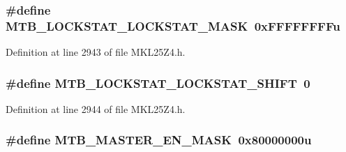 \subsubsection[{\texorpdfstring{M\+T\+B\+\_\+\+L\+O\+C\+K\+S\+T\+A\+T\+\_\+\+L\+O\+C\+K\+S\+T\+A\+T\+\_\+\+M\+A\+SK}{MTB_LOCKSTAT_LOCKSTAT_MASK}}]{\setlength{\rightskip}{0pt plus 5cm}\#define M\+T\+B\+\_\+\+L\+O\+C\+K\+S\+T\+A\+T\+\_\+\+L\+O\+C\+K\+S\+T\+A\+T\+\_\+\+M\+A\+SK~0x\+F\+F\+F\+F\+F\+F\+F\+Fu}\hypertarget{group___m_t_b___register___masks_ga8844dcbc4d3c0a3dcbb3ced21e84b950}{}\label{group___m_t_b___register___masks_ga8844dcbc4d3c0a3dcbb3ced21e84b950}


Definition at line 2943 of file M\+K\+L25\+Z4.\+h.

\subsubsection[{\texorpdfstring{M\+T\+B\+\_\+\+L\+O\+C\+K\+S\+T\+A\+T\+\_\+\+L\+O\+C\+K\+S\+T\+A\+T\+\_\+\+S\+H\+I\+FT}{MTB_LOCKSTAT_LOCKSTAT_SHIFT}}]{\setlength{\rightskip}{0pt plus 5cm}\#define M\+T\+B\+\_\+\+L\+O\+C\+K\+S\+T\+A\+T\+\_\+\+L\+O\+C\+K\+S\+T\+A\+T\+\_\+\+S\+H\+I\+FT~0}\hypertarget{group___m_t_b___register___masks_ga198cb66f9e01cde28d71dfab52f7b66c}{}\label{group___m_t_b___register___masks_ga198cb66f9e01cde28d71dfab52f7b66c}


Definition at line 2944 of file M\+K\+L25\+Z4.\+h.

\subsubsection[{\texorpdfstring{M\+T\+B\+\_\+\+M\+A\+S\+T\+E\+R\+\_\+\+E\+N\+\_\+\+M\+A\+SK}{MTB_MASTER_EN_MASK}}]{\setlength{\rightskip}{0pt plus 5cm}\#define M\+T\+B\+\_\+\+M\+A\+S\+T\+E\+R\+\_\+\+E\+N\+\_\+\+M\+A\+SK~0x80000000u}\hypertarget{group___m_t_b___register___masks_gab9f73fe136cde10e51b5192c621aaf7d}{}\label{group___m_t_b___register___masks_gab9f73fe136cde10e51b5192c621aaf7d}


